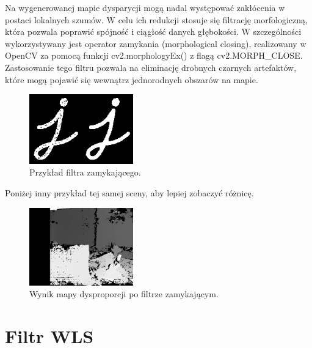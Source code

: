 \documentclass[magisterska]{pracadypl}
\begin{document}
Na wygenerowanej mapie dysparycji mogą nadal występować zakłócenia w postaci lokalnych szumów. W celu ich redukcji stosuje się filtrację morfologiczną, która pozwala poprawić spójność i ciągłość danych głębokości. W szczególności wykorzystywany jest operator zamykania (morphological closing), realizowany w OpenCV za pomocą funkcji cv2.morphologyEx() z flagą cv2.MORPH\_CLOSE. Zastosowanie tego filtru pozwala na eliminację drobnych czarnych artefaktów, które mogą pojawić się wewnątrz jednorodnych obszarów na mapie.

\begin{figure}[H]  %
    \centering  %
    \includegraphics[width=0.4\textwidth]{images/closing.png}  %
    \captionsetup{font=footnotesize}
    \caption[Przykład filtra zamykającego. https://docs.opencv.org/3.4/d9/d61/tutorial-py-morphological-ops.html]{Przykład filtra zamykającego.}
\end{figure}

Poniżej inny przykład tej samej sceny, aby lepiej zobaczyć różnicę.

\begin{figure}[H]  %
    \centering  %
    \includegraphics[width=0.4\textwidth]{images/dopracy4.png}  %
    \captionsetup{font=footnotesize}
    \caption[Wynik mapy dysproporcji po filtrze zamykającym. Opracowanie własne.]{Wynik mapy dysproporcji po filtrze zamykającym.}
\end{figure}

\section{Filtr WLS}
\end{document}
